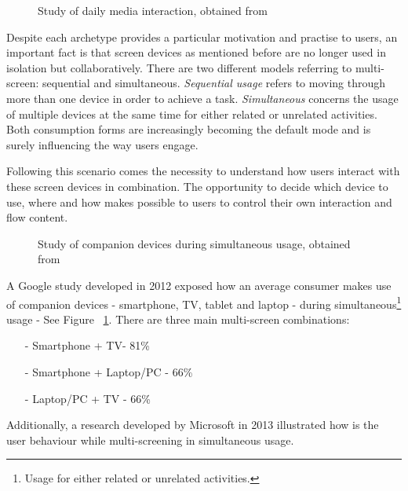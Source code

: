 \documentclass{acm_proc_article-sp}
\begin{document}
\begin{figure}[!htb]
\centering
{}
\caption{Study of daily media interaction, obtained from \cite{multiscreen:google}}
\end{figure}

Despite each archetype provides a particular motivation and practise to users, an important fact is that screen devices as mentioned before are no longer used in isolation but collaboratively. There are two different models referring to multi-screen:  sequential and simultaneous. \textit{Sequential usage} refers to moving through more than one device in order to achieve a task. \textit{Simultaneous} concerns the usage of multiple devices at the same time for either related or unrelated activities. Both consumption forms are increasingly becoming the default mode and is surely influencing the way users engage. 

Following this scenario comes the necessity to understand how users interact with these screen devices in combination\cite{hritzuk2014multiscreen}. The opportunity to decide which device to use, where and how makes possible to users to control their own interaction and flow content. 

\begin{figure}[!htb]
	\centering
	\caption{Study of companion devices during simultaneous	 usage, obtained from \cite{multiscreen:google}}
	\label{fig:simultaneous}
\end{figure}

A Google study developed in 2012 \cite{multiscreen:google} exposed how an average consumer makes use of companion devices - smartphone, TV, tablet and laptop - during simultaneous\footnote{Usage for either related or unrelated activities.} usage - See Figure ~\ref{fig:simultaneous}. There are three main multi-screen combinations:
\begin{itemize}
  \item[-] Smartphone + TV\hspace{1.35cm}- 81\% 
  \item[-] Smartphone + Laptop/PC \hspace{0.1cm}- 66\% 
  \item[-] Laptop/PC  + TV\hspace{1.35cm} - 66\% 
\end{itemize}

Additionally, a research developed by Microsoft in 2013 \cite{microsoftcross} illustrated how is the user behaviour while multi-screening in simultaneous usage.  
\end{document}
